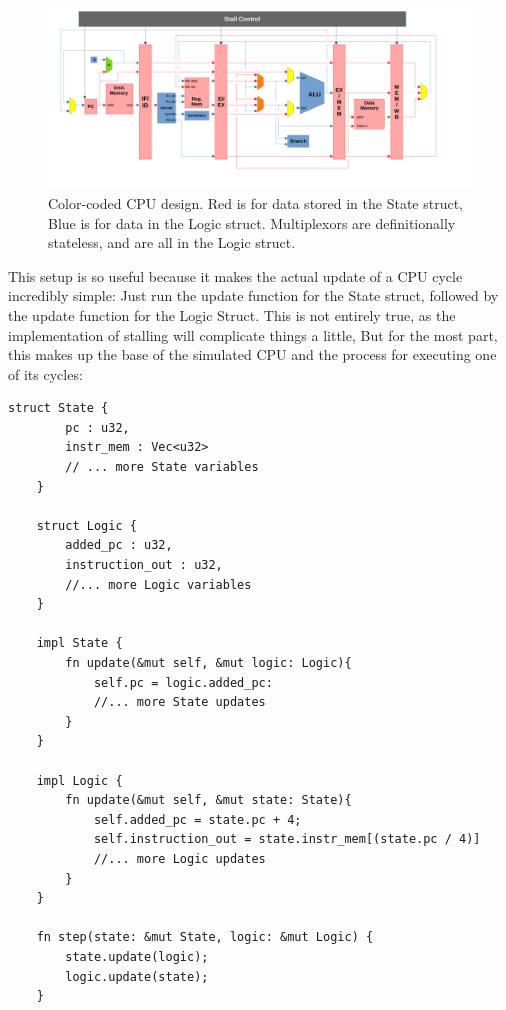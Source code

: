\documentclass[12pt,twoside]{reedthesis}
\begin{document}
\begin{figure}[h!]

	\centering
	\includegraphics[scale=0.4]{cpu_color}
	\caption{Color-coded CPU design. Red is for data stored in the State struct, Blue is for data in the Logic struct. Multiplexors are definitionally stateless, and are all in the Logic struct.}
	\label{cpu-color}
\end{figure}


This setup is so useful because it makes the actual update of a CPU cycle incredibly simple: Just run the update function for the State struct, followed by the update function for the Logic Struct. This is not entirely true, as the implementation of stalling will complicate things a little, But for the most part, this makes up the base of the simulated CPU and the process for executing one of its cycles:

\begin{lstlisting}[caption={Barebones layout of $components.rs$}]
	struct State {
		pc : u32,
		instr_mem : Vec<u32>
		// ... more State variables
	}

	struct Logic {
		added_pc : u32,
		instruction_out : u32,
		//... more Logic variables
	}

	impl State {
		fn update(&mut self, &mut logic: Logic){
			self.pc = logic.added_pc:
			//... more State updates
		}
	}

	impl Logic {
		fn update(&mut self, &mut state: State){
			self.added_pc = state.pc + 4;
			self.instruction_out = state.instr_mem[(state.pc / 4)]
			//... more Logic updates
		}
	}

	fn step(state: &mut State, logic: &mut Logic) {
		state.update(logic);
		logic.update(state);
	}
\end{lstlisting}
\end{document}

